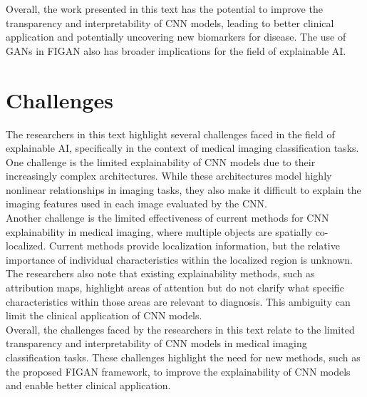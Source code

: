 \noindent
Overall, the work presented in this text has the potential to improve the transparency and interpretability of CNN models, leading to better clinical application and potentially uncovering new biomarkers for disease. The use of GANs in FIGAN also has broader implications for the field of explainable AI.

\clearpage

\section{Challenges}

\noindent
The researchers in this text highlight several challenges faced in the field of explainable AI, specifically in the context of medical imaging classification tasks. \\

\noindent
One challenge is the limited explainability of CNN models due to their increasingly complex architectures. While these architectures model highly nonlinear relationships in imaging tasks, they also make it difficult to explain the imaging features used in each image evaluated by the CNN. \\

\noindent
Another challenge is the limited effectiveness of current methods for CNN explainability in medical imaging, where multiple objects are spatially co-localized. Current methods provide localization information, but the relative importance of individual characteristics within the localized region is unknown. \\

\noindent
The researchers also note that existing explainability methods, such as attribution maps, highlight areas of attention but do not clarify what specific characteristics within those areas are relevant to diagnosis. This ambiguity can limit the clinical application of CNN models. \\

\noindent
Overall, the challenges faced by the researchers in this text relate to the limited transparency and interpretability of CNN models in medical imaging classification tasks. These challenges highlight the need for new methods, such as the proposed FIGAN framework, to improve the explainability of CNN models and enable better clinical application.
